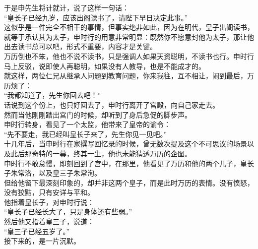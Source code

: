 \begin{multicols}{\theparacolNo}
于是申先生将计就计，说了这样一句话：\\

“皇长子已经九岁，应该出阁读书了，请陛下早日决定此事。”\\

这似乎是一件完全不相干的事情，但事实绝非如此，因为在明代，皇子出阁读书，就等于承认其为太子，申时行的用意非常明显：既然你不愿意封他为太子，那让他出去读书总可以吧，形式不重要，内容才是关键。\\

万历倒也不笨，他也不说不读书，只是强调人如果天资聪明，不读书也行。申时行马上反驳，说即使人再聪明，如果没有人教导，也是不能成才的。\\

就这样，两位仁兄从继承人问题到教育问题，你来我往，互不相让，闹到最后，万历烦了：\\

“我都知道了，先生你回去吧！”\\

话说到这个份上，也只好回去了，申时行离开了宫殿，向自己家走去。\\

然而当他刚刚踏出宫门的时候，却听到了身后急促的脚步声。\\

申时行转身，看见了一个太监，他带来了皇帝的谕令：\\

“先不要走，我已经叫皇长子来了，先生你见一见吧。”\\

十几年后，当申时行在家撰写回忆录的时候，曾无数次提及这个不可思议的场景以及此后那奇特的一幕，终其一生，他也未能猜透万历的企图。\\

申时行不敢怠慢，即刻回到了宫中，在那里，他看见了万历和他的两个儿子，皇长子朱常洛，以及皇三子朱常洵。\\

但给他留下最深刻印象的，却并非这两个皇子，而是此时万历的表情。没有愤怒，没有狡黠，只有安详与平和。\\

他指着皇长子，对申时行说：\\

“皇长子已经长大了，只是身体还有些弱。”\\

然后他又指着皇三子，说道：\\

“皇三子已经五岁了。”\\

接下来的，是一片沉默。\\


\end{multicols}
